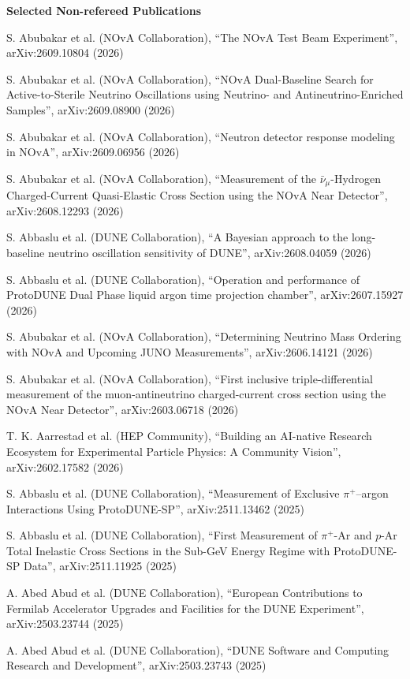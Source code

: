 {\bf Selected Non-refereed Publications}
\begin{list2}
\item S. Abubakar et al. (NOvA Collaboration), ``The NOvA Test Beam Experiment'', arXiv:2609.10804 (2026)
\item S. Abubakar et al. (NOvA Collaboration), ``NOvA Dual-Baseline Search for Active-to-Sterile Neutrino Oscillations using Neutrino- and Antineutrino-Enriched Samples'', arXiv:2609.08900 (2026)
\item S. Abubakar et al. (NOvA Collaboration), ``Neutron detector response modeling in NOvA'', arXiv:2609.06956 (2026)
\item S. Abubakar et al. (NOvA Collaboration), ``Measurement of the $\bar\nu_\mu$-Hydrogen Charged-Current Quasi-Elastic Cross Section using the NOvA Near Detector'', arXiv:2608.12293 (2026)
\item S. Abbaslu et al. (DUNE Collaboration), ``A Bayesian approach to the long-baseline neutrino oscillation sensitivity of DUNE'', arXiv:2608.04059 (2026)
\item S. Abbaslu et al. (DUNE Collaboration), ``Operation and performance of ProtoDUNE Dual Phase liquid argon time projection chamber'', arXiv:2607.15927 (2026)
\item S. Abubakar et al. (NOvA Collaboration), ``Determining Neutrino Mass Ordering with NOvA and Upcoming JUNO Measurements'', arXiv:2606.14121 (2026)
\item S. Abubakar et al. (NOvA Collaboration), ``First inclusive triple-differential measurement of the muon-antineutrino charged-current cross section using the NOvA Near Detector'', arXiv:2603.06718 (2026)
\item T. K. Aarrestad et al. (HEP Community), ``Building an AI-native Research Ecosystem for Experimental Particle Physics: A Community Vision'', arXiv:2602.17582 (2026)
\item S. Abbaslu et al. (DUNE Collaboration), ``Measurement of Exclusive $\pi^+$--argon Interactions Using ProtoDUNE-SP'', arXiv:2511.13462 (2025)
\item S. Abbaslu et al. (DUNE Collaboration), ``First Measurement of $\pi^+$-Ar and $p$-Ar Total Inelastic Cross Sections in the Sub-GeV Energy Regime with ProtoDUNE-SP Data'', arXiv:2511.11925 (2025)
\item A. Abed Abud et al. (DUNE Collaboration), ``European Contributions to Fermilab Accelerator Upgrades and Facilities for the DUNE Experiment'', arXiv:2503.23744 (2025)
\item A. Abed Abud et al. (DUNE Collaboration), ``DUNE Software and Computing Research and Development'', arXiv:2503.23743 (2025)

\end{list2}
